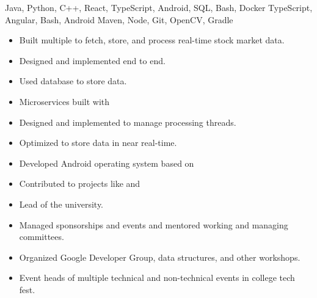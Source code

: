 Java, Python, C++, React, TypeScript, Android, SQL, Bash, Docker\newline
{}TypeScript, Angular, Bash, Android\newline
{}Maven, Node, Git, OpenCV, Gradle\newline


\begin{itemize}
  \item Built multiple to fetch, store, and process real-time stock market data.
  \item Designed and implemented end to end.
  \item Used database to store data.
  \item Microservices built with 
  \item Designed and implemented to manage processing threads.
  \item Optimized to store data in near real-time.
 \end{itemize}

\begin{itemize}
  \item Developed Android operating system based on 
  \item Contributed to projects like and 
 \end{itemize}


\begin{itemize}
    \item Lead of the university.
    \item Managed sponsorships and events and mentored working and managing committees.
    \item Organized Google Developer Group, data structures, and other workshops.
 \end{itemize}
\begin{itemize}
    \item Event heads of multiple technical and non-technical events in college tech fest.
 \end{itemize}

